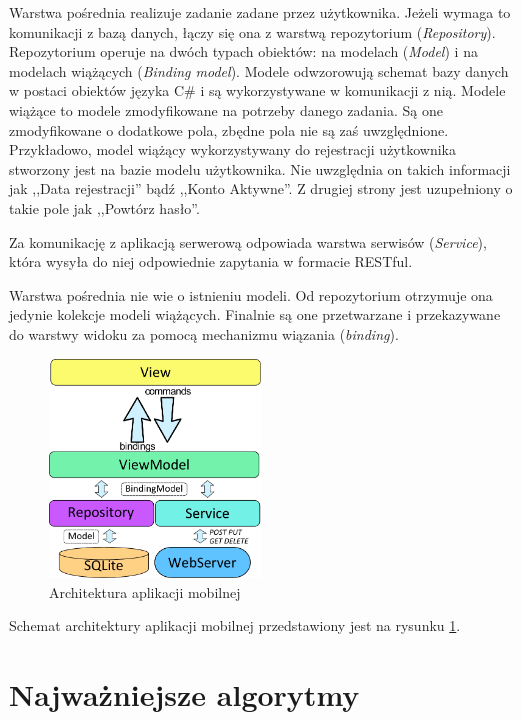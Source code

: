 \documentclass{book}
\begin{document}
			Warstwa pośrednia realizuje zadanie zadane przez użytkownika. Jeżeli wymaga to komunikacji z bazą danych, łączy się ona z warstwą repozytorium (\emph{Repository}). Repozytorium operuje na dwóch typach obiektów: na modelach (\emph{Model}) i na modelach wiążących (\emph{Binding model}). Modele odwzorowują schemat bazy danych w postaci obiektów języka C\# i są wykorzystywane w komunikacji z nią. Modele wiążące to modele zmodyfikowane na potrzeby danego zadania.  %
			Są one zmodyfikowane o dodatkowe pola, zbędne pola nie są zaś uwzględnione. Przykładowo, model wiążący wykorzystywany do rejestracji użytkownika stworzony jest na bazie modelu użytkownika. Nie uwzględnia on takich informacji jak ,,Data rejestracji'' bądź ,,Konto Aktywne''. Z drugiej strony jest uzupełniony o takie pole jak ,,Powtórz hasło''.
			
			Za komunikację z aplikacją serwerową odpowiada warstwa serwisów (\emph{Service}), która wysyła do niej odpowiednie zapytania w formacie RESTful. 
			
			Warstwa pośrednia nie wie o istnieniu modeli. Od repozytorium otrzymuje ona jedynie kolekcje modeli wiążących. Finalnie są one przetwarzane i przekazywane do warstwy widoku za pomocą mechanizmu wiązania (\emph{binding}).
			\begin{figure}
				\centering
				\includegraphics[width=0.5\textwidth]{images/architektura_mobile.pdf}
				\caption{Architektura aplikacji mobilnej}
				\label{fig:architektura_mobile}
			\end{figure}
			
			Schemat architektury aplikacji mobilnej przedstawiony jest na rysunku \ref{fig:architektura_mobile}. 
			
		\section{Najważniejsze algorytmy}
\end{document}
